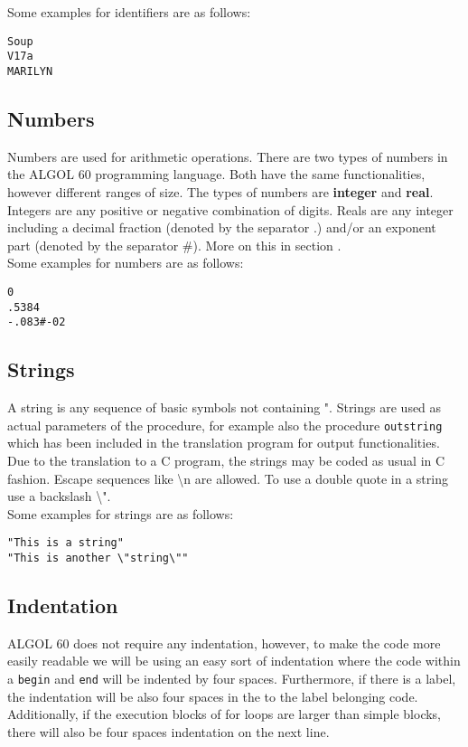 \documentclass{article}
\begin{document}
Some examples for identifiers are as follows:\\

\begin{lstlisting}[language={[60]algol}]
Soup
V17a
MARILYN
\end{lstlisting}

\subsection{Numbers} \label{numbers}
Numbers are used for arithmetic operations. There are two types of numbers in the ALGOL 60 programming language. Both have the same functionalities, however different ranges of size. The types of numbers are \textbf{integer} and \textbf{real}. Integers are any positive or negative combination of digits. Reals are any integer including a decimal fraction (denoted by the separator .) and/or an exponent part (denoted by the separator \#). More on this in section .\\ 

Some examples for numbers are as follows:\\

\begin{lstlisting}[language={[60]algol}]
0
.5384
-.083#-02
\end{lstlisting}

\subsection{Strings}
A string is any sequence of basic symbols not containing ". Strings are used as actual parameters of the procedure, for example also the procedure \texttt{outstring} which has been included in the translation program for output functionalities. Due to the translation to a C program, the strings may be coded as usual in C fashion. Escape sequences like \textbackslash n are allowed. To use a double quote in a string use a backslash \textbackslash".\\ 

Some examples for strings are as follows:\\

\begin{lstlisting}[language={[60]algol}]
"This is a string"
"This is another \"string\""
\end{lstlisting}

\subsection{Indentation}
ALGOL 60 does not require any indentation, however, to make the code more easily readable we will be using an easy sort of indentation where the code within a \texttt{begin} and \texttt{end} will be indented by four spaces. Furthermore, if there is a label, the indentation will be also four spaces in the to the label belonging code. Additionally, if the execution blocks of for loops are larger than simple blocks, there will also be four spaces indentation on the next line.
\end{document}
